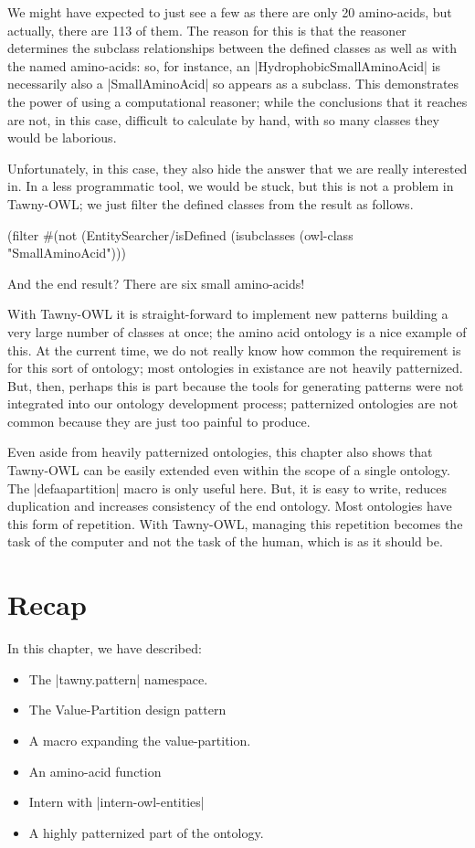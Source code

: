We might have expected to just see a few as there are only 20 amino-acids, but
actually, there are 113 of them. The reason for this is that the reasoner
determines the subclass relationships between the defined classes as well as
with the named amino-acids: so, for instance, an |HydrophobicSmallAminoAcid|
is necessarily also a |SmallAminoAcid| so appears as a subclass. This
demonstrates the power of using a computational reasoner; while the
conclusions that it reaches are not, in this case, difficult to calculate by
hand, with so many classes they would be laborious.

Unfortunately, in this case, they also hide the answer that we are really
interested in. In a less programmatic tool, we would be stuck, but this is not
a problem in Tawny-OWL; we just filter the defined classes from the result as
follows.

\begin{tawny}
(filter
 #(not (EntitySearcher/isDefined %
 (isubclasses
  (owl-class "SmallAminoAcid")))
\end{tawny}

And the end result? There are six small amino-acids!

With Tawny-OWL it is straight-forward to implement new patterns building a
very large number of classes at once; the amino acid ontology is a nice
example of this. At the current time, we do not really know how common the
requirement is for this sort of ontology; most ontologies in existance are not
heavily patternized. But, then, perhaps this is part because the tools for
generating patterns were not integrated into our ontology development process;
patternized ontologies are not common because they are just too painful to
produce.

Even aside from heavily patternized ontologies, this chapter also shows that
Tawny-OWL can be easily extended even within the scope of a single ontology.
The |defaapartition| macro is only useful here. But, it is easy to write,
reduces duplication and increases consistency of the end ontology. Most
ontologies have this form of repetition. With Tawny-OWL, managing this
repetition becomes the task of the computer and not the task of the human,
which is as it should be.

\section{Recap}
\label{sec:recap-2}

In this chapter, we have described:

\begin{itemize}
\item The |tawny.pattern| namespace.
\item The Value-Partition design pattern
\item A macro expanding the value-partition.
\item An amino-acid function
\item Intern with |intern-owl-entities|
\item A highly patternized part of the ontology.
\end{itemize}
